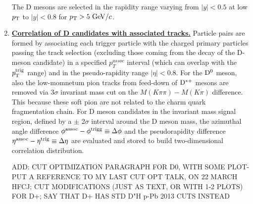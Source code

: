 \begin{enumerate}

The D mesons are selected in the rapidity range varying from $|y|<0.5$ at low $p_{\rm T}$ to $|y|<0.8$ for $p_{\rm T}>5~\mathrm{GeV}/c$. %

\item
\underline {\bf Correlation of D candidates with associated tracks.}
Particle pairs are formed by associating each trigger particle with
the charged primary particles passing the track selection (excluding those coming from the decay of the D-meson candidate) in a specified $p^{assoc}_{T}$
interval (which can overlap with the $p_{\rm T}^{\rm trig}$ range) and in the pseudo-rapidity range $|\eta|<0.8$. For the ${\rm D^0}$ meson, also the low-momnetum pion tracks from feed-down of ${\rm D^{*+}}$ mesons are removed via 3$\sigma$ invariant mass cut on the $M(K\pi\pi)-M(K\pi)$ difference. This because these soft pion are not related to the charm quark fragmentation chain.
For D meson candidates in the invariant mass signal region, defined by a $\pm$ 2$\sigma$ interval around the D meson mass, the azimuthal angle difference $\phi^{\rm assoc}-\phi^{\rm trigg}\equiv\Delta\phi$
and the pseudorapidity difference $\eta^{\rm assoc}-\eta^{\rm trig}\equiv\Delta \eta$ are evaluated and stored to build two-dimensional correlation distribution. %

ADD: CUT OPTIMIZATION PARAGRAPH FOR D0, WITH SOME PLOT- PUT A REFERENCE TO MY LAST CUT OPT TALK, ON 22 MARCH HFCJ; CUT MODIFICATIONS (JUST AS TEXT, OR WITH 1-2 PLOTS) FOR D+; SAY THAT D+ HAS STD D"H p-Pb 2013 CUTS INSTEAD


\end{enumerate}
